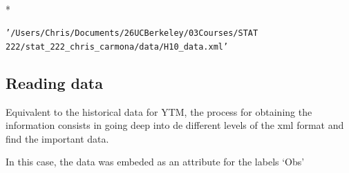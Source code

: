 \documentclass[letterpaper,10pt,english]{/anaconda/lib/python2.7/site-packages/sphinx/texinputs/sphinxhowto}
\def\smaller{\fontsize{9.5pt}{9.5pt}\selectfont}
\newenvironment{InvisibleVerbatim}
        {\begin{mdframed}[leftmargin=0.1\linewidth,innerleftmargin=3pt,innerrightmargin=3pt, userdefinedwidth=1\linewidth, linewidth=0pt, linecolor=white, usetwoside=false]}
        {\end{mdframed}}
\begin{document}
                \makebox[0.1\linewidth]{\smaller\hfill\tt\color{nbframe-out-prompt}Out\hspace{4pt}{[}12{]}:\hspace{4pt}}\\*
                \vspace{-2.55\baselineskip}\begin{InvisibleVerbatim}
                \vspace{-0.5\baselineskip}
\begin{alltt}'/Users/Chris/Documents/26 UC Berkeley/03 Courses/STAT
222/stat\_222\_chris\_carmona/data/H10\_data.xml'\end{alltt}

            \end{InvisibleVerbatim}
            
        
    
\subsection{Reading data}Equivalent to the historical data for YTM, the process for obtaining the
information consists in going deep into de different levels of the xml
format and find the important data.

In this case, the data was embeded as an attribute for the labels `Obs'

\end{document}
